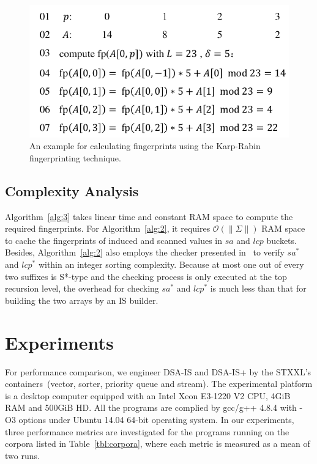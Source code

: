 \documentclass[10pt,journal,compsoc]{IEEEtran}
\begin{document}
\begin{figure}[htbp!]
	\centering
	
	\includegraphics[width = 1\columnwidth]{example2.pdf}
	
	\caption{An example for calculating fingerprints using the Karp-Rabin fingerprinting technique.}
	
	\label{fig:example2}
	
\end{figure}

\subsection{Complexity Analysis}

Algorithm~\ref{alg:3} takes linear time and constant RAM space to compute the required fingerprints. For Algorithm~\ref{alg:2}, it requires $\mathcal{O}(\|\Sigma\|)$ RAM space to cache the fingerprints of induced and scanned values in $sa$ and $lcp$ buckets. Besides, Algorithm~\ref{alg:2} also employs the checker presented in~\cite{wu2017} to verify $sa^*$ and $lcp^*$ within an integer sorting complexity. Because at most one out of every two suffixes is S*-type and the checking process is only executed at the top recursion level, the overhead for checking $sa^*$ and $lcp^*$ is much less than that for building the two arrays by an IS builder.

\section{Experiments} \label{sec:experiments}

For performance comparison, we engineer DSA-IS and DSA-IS+ by the STXXL's containers~(vector, sorter, priority queue and stream). The experimental platform is a desktop computer equipped with an Intel Xeon E3-1220 V2 CPU, 4GiB RAM and 500GiB HD. All the programs are complied by gcc/g++ 4.8.4 with -O3 options under Ubuntu 14.04 64-bit operating system. In our experiments, three performance metrics are investigated for the programs running on the corpora listed in Table~\ref{tbl:corpora}, where each metric is measured as a mean of two runs.
\end{document}

